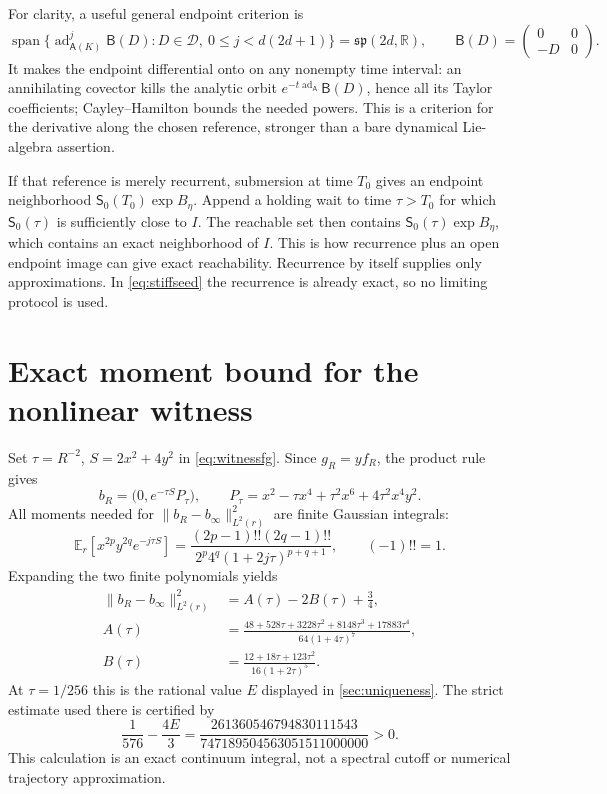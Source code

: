 \documentclass[11pt]{article}
\numberwithin{equation}{section}
\theoremstyle{definition}
\newcommand{\R}{\mathbb R}
\newcommand{\calD}{\mathcal D}
\begin{document}
For clarity, a useful general endpoint criterion is
\[
 \operatorname{span}\{
   \operatorname{ad}_{\mathsf A(K)}^j\mathsf B(D):
     D\in\calD,\ 0\leq j<d(2d+1)\}
       =\mathfrak{sp}(2d,\R),
 \qquad
 \mathsf B(D)=\begin{pmatrix}0&0\\-D&0\end{pmatrix}.
\]
It makes the endpoint differential onto on any nonempty time
interval: an annihilating covector kills the analytic orbit
$e^{-t\operatorname{ad}_{\mathsf A}}\mathsf B(D)$, hence all
its Taylor coefficients; Cayley--Hamilton bounds the needed
powers. This is a criterion for the derivative along the chosen
reference, stronger than a bare dynamical Lie-algebra assertion.

If that reference is merely recurrent, submersion at time $T_0$
gives an endpoint neighborhood
$\mathsf S_0(T_0)\exp B_\eta$. Append a holding wait to time
$\tau>T_0$ for which $\mathsf S_0(\tau)$ is sufficiently close
to $I$. The reachable set then contains
$\mathsf S_0(\tau)\exp B_\eta$, which contains an exact
neighborhood of $I$. This is how recurrence plus an open endpoint
image can give exact reachability. Recurrence by itself supplies
only approximations. In \eqref{eq:stiffseed} the recurrence is
already exact, so no limiting protocol is used.

\section{Exact moment bound for the nonlinear witness}\label{app:witness}

Set $\tau=R^{-2}$, $S=2x^2+4y^2$ in \eqref{eq:witnessfg}.
Since $g_R=yf_R$, the product rule gives
\[
 b_R=\bigl(0,e^{-\tau S}P_\tau\bigr),\qquad
 P_\tau=x^2-\tau x^4+\tau^2x^6+4\tau^2x^4y^2 .
\]
All moments needed for $\|b_R-b_\infty\|_{L^2(r)}^2$ are
finite Gaussian integrals:
\[
 \mathbb E_r[x^{2p}y^{2q}e^{-j\tau S}]
   =\frac{(2p-1)!!(2q-1)!!}
      {2^p4^q(1+2j\tau)^{p+q+1}},\qquad (-1)!!=1.
\]
Expanding the two finite polynomials yields
\begin{align*}
 \|b_R-b_\infty\|_{L^2(r)}^2
    &=A(\tau)-2B(\tau)+\frac34,\\
 A(\tau)&=
 \frac{48+528\tau+3228\tau^2+8148\tau^3+17883\tau^4}
      {64(1+4\tau)^7},\\
 B(\tau)&=\frac{12+18\tau+123\tau^2}
                 {16(1+2\tau)^5}.
\end{align*}
At $\tau=1/256$ this is the rational value $E$ displayed in
\cref{sec:uniqueness}. The strict estimate used there is certified by
\[
 \frac1{576}-\frac{4E}{3}
 =\frac{261360546794830111543}
        {747189504563051511000000}>0 .
\]
This calculation is an exact continuum integral, not a spectral
cutoff or numerical trajectory approximation.
\end{document}
